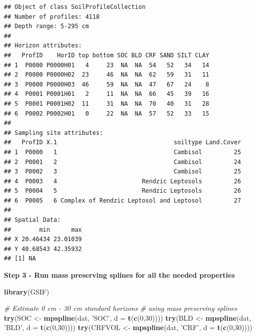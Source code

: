 \documentclass[10pt,b5paper,]{book}
\newenvironment{Shaded}{\begin{snugshade}}{\end{snugshade}}
\newcommand{\CommentTok}[1]{\textcolor[rgb]{0.56,0.35,0.01}{\textit{#1}}}
\newcommand{\DataTypeTok}[1]{\textcolor[rgb]{0.13,0.29,0.53}{#1}}
\newcommand{\DecValTok}[1]{\textcolor[rgb]{0.00,0.00,0.81}{#1}}
\newcommand{\KeywordTok}[1]{\textcolor[rgb]{0.13,0.29,0.53}{\textbf{#1}}}
\newcommand{\NormalTok}[1]{#1}
\newcommand{\StringTok}[1]{\textcolor[rgb]{0.31,0.60,0.02}{#1}}
\theoremstyle{definition}
\theoremstyle{definition}
\theoremstyle{definition}
\theoremstyle{remark}
\begin{document}
\begin{verbatim}
## Object of class SoilProfileCollection
## Number of profiles: 4118
## Depth range: 5-295 cm
## 
## Horizon attributes:
##   ProfID    HorID top bottom SOC BLD CRF SAND SILT CLAY
## 1  P0000 P0000H01   4     23  NA  NA  54   52   34   14
## 2  P0000 P0000H02  23     46  NA  NA  62   59   31   11
## 3  P0000 P0000H03  46     59  NA  NA  47   67   24    8
## 4  P0001 P0001H01   2     11  NA  NA  66   45   39   16
## 5  P0001 P0001H02  11     31  NA  NA  70   40   31   28
## 6  P0002 P0002H01   0     22  NA  NA  57   52   33   15
## 
## Sampling site attributes:
##   ProfID X.1                                 soiltype Land.Cover
## 1  P0000   1                                 Cambisol         25
## 2  P0001   2                                 Cambisol         24
## 3  P0002   3                                 Cambisol         25
## 4  P0003   4                        Rendzic Leptosols         26
## 5  P0004   5                        Rendzic Leptosols         26
## 6  P0005   6 Complex of Rendzic Leptosol and Leptosol         27
## 
## Spatial Data:
##        min      max
## X 20.46434 23.01039
## Y 40.68543 42.35932
## [1] NA
\end{verbatim}

\textbf{Step 3 - Run mass preserving splines for all the needed
properties}

\begin{Shaded}
\begin{Highlighting}[]
\KeywordTok{library}\NormalTok{(GSIF)}

\CommentTok{# Estimate 0 cm - 30 cm standard horizons}
\CommentTok{# using mass preserving splines}
\KeywordTok{try}\NormalTok{(SOC <-}\StringTok{ }\KeywordTok{mpspline}\NormalTok{(dat, }\StringTok{'SOC'}\NormalTok{, }\DataTypeTok{d =} \KeywordTok{t}\NormalTok{(}\KeywordTok{c}\NormalTok{(}\DecValTok{0}\NormalTok{,}\DecValTok{30}\NormalTok{))))}
\KeywordTok{try}\NormalTok{(BLD <-}\StringTok{ }\KeywordTok{mpspline}\NormalTok{(dat, }\StringTok{'BLD'}\NormalTok{, }\DataTypeTok{d =} \KeywordTok{t}\NormalTok{(}\KeywordTok{c}\NormalTok{(}\DecValTok{0}\NormalTok{,}\DecValTok{30}\NormalTok{))))}
\KeywordTok{try}\NormalTok{(CRFVOL <-}\StringTok{ }\KeywordTok{mpspline}\NormalTok{(dat, }\StringTok{'CRF'}\NormalTok{, }\DataTypeTok{d =} \KeywordTok{t}\NormalTok{(}\KeywordTok{c}\NormalTok{(}\DecValTok{0}\NormalTok{,}\DecValTok{30}\NormalTok{))))}
\end{Highlighting}
\end{Shaded}
\end{document}
